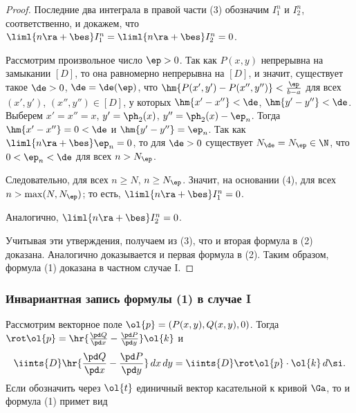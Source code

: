 \documentclass[a4paper]{article}
\begin{document}
\begin{proof}
Последние два интеграла в правой части (3) обозначим $I_1^n$ и
$I_2^n$, соответственно, и докажем, что $\liml{n\ra+\bes} I_1^n =
\liml{n\ra+\bes} I_2^n=0$.

Рассмотрим произвольное число $\ep>0$. Так как $P(x,y)$ непрерывна
на замыкании $[D]$, то она равномерно непрерывна на $[D]$, и значит,
существует такое $\de>0$, $\de=\de(\ep)$, что
$\hm{P(x',y')-P(x'',y'')} < \frac{\ep}{b-a}$ для всех $(x',y')$,
$(x'',y'')\in[D]$, у которых $\hm{x'-x''}<\de$, $\hm{y'-y''}<\de$.
Выберем $x'=x''=x$, $y'=\ph_2(x)$, $y''=\ph_2(x)-\ep_n$. Тогда
$\hm{x'-x''}=0<\de$ и $\hm{y'-y''} = \ep_n$. Так как
$\liml{n\ra+\bes}\ep_n=0$, то для $\de>0$ существует
$N_{\de}=N_{\ep}\in\N$, что $0<\ep_n<\de$ для всех $n>N_{\ep}$.

Следовательно,  для всех $n\ge N$, $n\ge N_{\ep}$. Значит, на
основании (4),  для всех $n>\max(N,N_{\ep})$; то есть,
$\liml{n\ra+\bes}I_1^n=0$.

Аналогично, $\liml{n\ra+\bes}I_2^n=0$.

Учитывая эти утверждения, получаем из (3), что  и вторая формула в (2) доказана. Аналогично
доказывается и первая формула в (2). Таким образом, формула (1)
доказана в частном случае I.
\end{proof}

\subsubsection{Инвариантная запись формулы (1) в случае I}

Рассмотрим векторное поле $\ol{p} = (P(x,y),Q(x,y),0)$. Тогда
$\rot\ol{p}=\hr{\frac{\pd Q}{\pd x} - \frac{\pd P}{\pd y}}\ol{k}$ и
$$\iints{D} \hr{\frac{\pd Q}{\pd x} - \frac{\pd P}{\pd y}}\,dx\,dy =
\iints{D} \rot\ol{p}\cdot \ol{k}\,d\si.$$ Если обозначить через
$\ol{t}$ единичный вектор касательной к кривой $\Ga$, то
и формула (1) примет вид 
\end{document}

